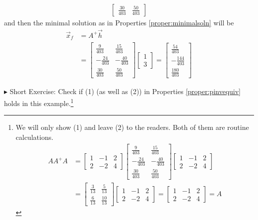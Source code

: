 \begin{solution}
\begin{align*}
\begin{bmatrix}
\frac{30}{403} & \frac{50}{403}
\end{bmatrix}
\end{align*}
and then the minimal solution as in Properties \ref{proper:minimalsoln} will be
\begin{align*}
\vec{x}_f &= A^+\vec{h} \\
&= \begin{bmatrix}
\frac{9}{403} & \frac{15}{403}\\ 
-\frac{24}{403} & -\frac{40}{403}\\ 
\frac{30}{403} & \frac{50}{403}
\end{bmatrix}
\begin{bmatrix}
1 \\
3
\end{bmatrix} =
\begin{bmatrix}
\frac{54}{403}\\ 
-\frac{144}{403}\\ 
\frac{180}{403}
\end{bmatrix}
\end{align*}
\end{solution}
$\blacktriangleright$ Short Exercise: Check if (1) (as well as (2)) in Properties \ref{proper:pinvequiv} holds in this example.\footnote{We will only show (1) and leave (2) to the readers. Both of them are routine calculations.
\begin{align*}
AA^+A &= \begin{bmatrix}
1 & -1 & 2 \\
2 & -2 & 4
\end{bmatrix} 
\begin{bmatrix}
\frac{9}{403} & \frac{15}{403}\\ 
-\frac{24}{403} & -\frac{40}{403}\\ 
\frac{30}{403} & \frac{50}{403}
\end{bmatrix}
\begin{bmatrix}
1 & -1 & 2 \\
2 & -2 & 4
\end{bmatrix} \\
&=
\begin{bmatrix}
\frac{3}{13}&\frac{5}{13}\\ 
\frac{6}{13}&\frac{10}{13}
\end{bmatrix}
\begin{bmatrix}
1 & -1 & 2 \\
2 & -2 & 4
\end{bmatrix}
= 
\begin{bmatrix}
1 & -1 & 2 \\
2 & -2 & 4
\end{bmatrix}
= A
\end{align*}
}

